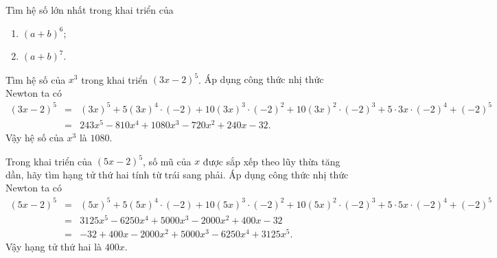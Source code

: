 \begin{vd}%
%
Tìm hệ số lớn nhất trong khai triển của
\begin{enumerate}
\item $(a+b)^6$;
\item $(a+b)^7$.
\end{enumerate}
\end{vd}

\begin{center}
	\baitaptl
\end{center}

\begin{bt}%
%
Tìm hệ số của $x^3$ trong khai triển $(3x-2)^5$.
\loigiai
{
Áp dụng công thức nhị thức Newton ta có
\begin{eqnarray*}
(3x-2)^5 & = & (3x)^5+5(3x)^4\cdot (-2)+10(3x)^3\cdot (-2)^2+10(3x)^2\cdot (-2)^3+5\cdot 3x\cdot (-2)^4+(-2)^5\\
& = & 243x^5-810x^4+1080x^3-720x^2+240x-32.
\end{eqnarray*}
Vậy hệ số của $x^3$ là $1080$.
}
\end{bt}

\begin{bt}%
%
Trong khai triển của $(5x-2)^5$, số mũ của $x$ được sắp xếp theo lũy thừa tăng dần, hãy tìm hạng tử thứ hai tính từ trái sang phải.
\loigiai
{
Áp dụng công thức nhị thức Newton ta có
\begin{eqnarray*}
(5x-2)^5 & = & (5x)^5+5(5x)^4\cdot (-2)+10(5x)^3\cdot (-2)^2+10(5x)^2\cdot (-2)^3+5\cdot 5x\cdot (-2)^4+(-2)^5\\
& = & 3125x^5-6250x^4+5000x^3-2000x^2+400x-32\\
& = & -32+400x-2000x^2+5000x^3-6250x^4+3125x^5.
\end{eqnarray*}
Vậy hạng tử thứ hai là $400x$.
}
\end{bt}

